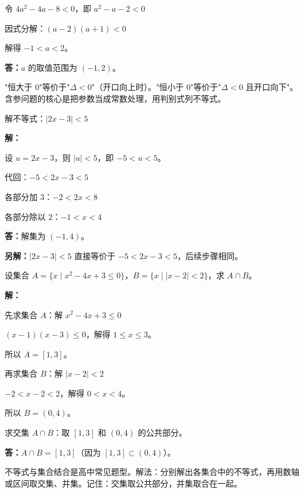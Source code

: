 \documentclass[12pt, a4paper]{ctexart}
\begin{document}
令 $4a^2 - 4a - 8 < 0$，即 $a^2 - a - 2 < 0$

因式分解：$(a - 2)(a + 1) < 0$

解得 $-1 < a < 2$。

\textbf{答：}$a$ 的取值范围为 $(-1, 2)$。

\begin{tipbox}[方法总结]
"恒大于 $0$"等价于"$\Delta < 0$"（开口向上时）。"恒小于 $0$"等价于"$\Delta < 0$ 且开口向下"。含参问题的核心是把参数当成常数处理，用判别式列不等式。
\end{tipbox}

\begin{examplebox}[【例题7】绝对值不等式]
解不等式：$|2x - 3| < 5$
\end{examplebox}

\textbf{解：}

设 $u = 2x - 3$，则 $|u| < 5$，即 $-5 < u < 5$。

代回：$-5 < 2x - 3 < 5$

各部分加 $3$：$-2 < 2x < 8$

各部分除以 $2$：$-1 < x < 4$

\textbf{答：}解集为 $(-1, 4)$。

\medskip
\textbf{另解：}$|2x - 3| < 5$ 直接等价于 $-5 < 2x - 3 < 5$，后续步骤相同。

\begin{examplebox}
设集合 $A = \{x \mid x^2 - 4x + 3 \leq 0\}$，$B = \{x \mid |x - 2| < 2\}$，求 $A \cap B$。
\end{examplebox}

\textbf{解：}

先求集合 $A$：解 $x^2 - 4x + 3 \leq 0$

$(x - 1)(x - 3) \leq 0$，解得 $1 \leq x \leq 3$。

所以 $A = [1, 3]$。

\medskip
再求集合 $B$：解 $|x - 2| < 2$

$-2 < x - 2 < 2$，解得 $0 < x < 4$。

所以 $B = (0, 4)$。

\medskip
求交集 $A \cap B$：取 $[1, 3]$ 和 $(0, 4)$ 的公共部分。

\textbf{答：}$A \cap B = [1, 3]$（因为 $[1, 3] \subset (0, 4)$）。

\begin{tipbox}[方法总结]
不等式与集合结合是高中常见题型。解法：分别解出各集合中的不等式，再用数轴或区间取交集、并集。记住：交集取公共部分，并集取合在一起。
\end{tipbox}
\end{document}
